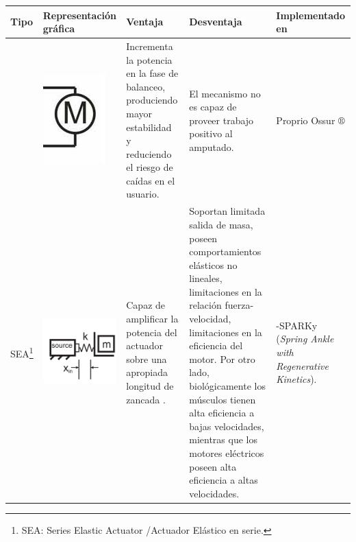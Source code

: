 \documentclass[12pt,english]{article}
\providecommand{\tabularnewline}{\\}
\begin{document}
\begin{center}
\begin{longtable}{|>{\centering}p{15mm}|>{\centering}p{30mm}|>{\centering}p{40mm}|>{\centering}p{40mm}|>{\centering}p{24mm}|}
\hline
\hline 
\textbf{\small{}Tipo} & \textbf{\small{}Representación gráfica} & \textbf{\small{}Ventaja} & \textbf{\small{}Desventaja} & \textbf{\small{}Implementado en}\tabularnewline
\hline
\endhead
\hline 
{\small{}\emph{Direct Drive} (Actuación rígida)} & {\small{}\vspace{5 mm}}{\small \par}

{\small{}\includegraphics[scale=0.6]{DD.PNG}} & {\small{}Incrementa la potencia en la fase de balanceo, produciendo
mayor estabilidad y reduciendo el riesgo de caídas en el usuario\cite{Ossur}.} & {\small{}El mecanismo no es capaz de proveer trabajo positivo al amputado\cite{herr2014powered}.} & {\small{}Proprio Ossur $\circledR$}\tabularnewline
\hline 
{\small{}SEA}\footnote{SEA: Series Elastic Actuator /Actuador Elástico en serie.}{\small{}
\nomenclature[Series Elastic Actuator]{SEA}{\emph{Series Elastic Actuator} / Actuador Elástico en Serie}} & {\small{}\vspace{10 mm}}{\small \par}

{\small{}\includegraphics[scale=0.7]{SEAmodel.PNG}} & {\small{}Capaz de amplificar la potencia del actuador sobre una apropiada
longitud de zancada \cite{Paluska2006a}.} & {\small{}Soportan limitada salida de masa, poseen comportamientos
elásticos no lineales, limitaciones en la relación fuerza-velocidad,
limitaciones en la eficiencia del motor. Por otro lado, biológicamente
los músculos tienen alta eficiencia a bajas velocidades, mientras
que los motores eléctricos poseen alta eficiencia a altas velocidades\cite{Paluska2006a}.} & {\small{}-SPARKy (\emph{Spring Ankle with Regenerative Kinetics})\cite{Holgate2008,Bellman2008}.}{\small \par}


\end{longtable}
\end{center}
\end{document}
